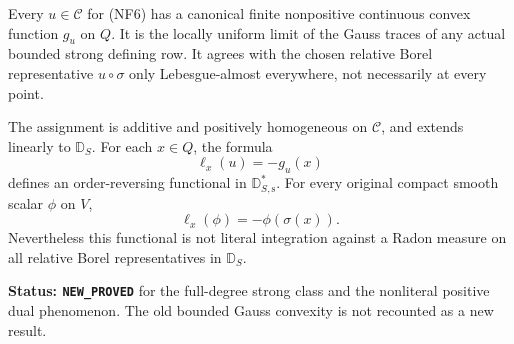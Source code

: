 \begin{proposition}
\label{prop:r12-completed-gauss-evaluation}
Every $u\in\mathscr C$ for (NF6) has a canonical finite
nonpositive continuous convex function $g_u$ on $Q$.
It is the locally uniform limit of the Gauss traces of any
actual bounded strong defining row. It agrees with the
chosen relative Borel representative $u\circ\sigma$ only
Lebesgue-almost everywhere, not necessarily at every point.

The assignment is additive and positively homogeneous on
$\mathscr C$, and extends linearly to $\mathbb D_S$.
For each $x\in Q$, the formula
\[
                         \ell_x(u)=-g_u(x)
 \tag{NF7}
\]
defines an order-reversing functional in
$\mathbb D_{S,\mathrm s}^*$. For every original compact
smooth scalar $\phi$ on $V$,
\[
                              \ell_x(\phi)=-\phi(\sigma(x)).
 \tag{NF8}
\]
Nevertheless this functional is not literal integration
against a Radon measure on all relative Borel representatives
in $\mathbb D_S$.
\end{proposition}

\noindent\textbf{Status: \texttt{NEW\_PROVED}} for the
full-degree strong class and the nonliteral positive dual
phenomenon. The old bounded Gauss convexity is not recounted
as a new result.

